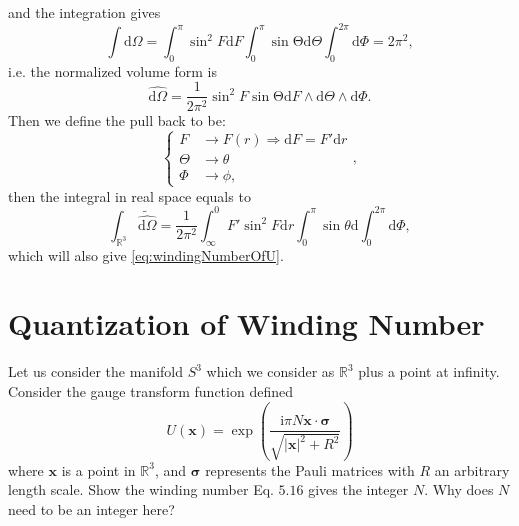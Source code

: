 \documentclass{book}
\begin{document}
and the integration gives
\begin{equation*}
\int \mathrm{d} \Omega =\int _{0}^{\pi }\sin^{2} F\mathrm{d} F\int _{0}^{\pi }\sin\mathrm{\Theta d} \Theta \int _{0}^{2\pi }\mathrm{d} \Phi =2\pi ^{2} ,
\end{equation*}
i.e. the normalized volume form is
\begin{equation*}
\hat{\mathrm{d} \Omega } =\frac{1}{2\pi ^{2}}\sin^{2} F\sin\mathrm{\Theta d} F\land \mathrm{d} \Theta \land \mathrm{d} \Phi .
\end{equation*}
Then we define the pull back to be:
\begin{equation*}
\left\{\begin{aligned}
F & \rightarrow F( r) \Rightarrow \mathrm{d} F=F'\mathrm{d} r\\
\Theta  & \rightarrow \theta \\
\Phi  & \rightarrow \phi ,
\end{aligned}\right. ,
\end{equation*}
then the integral in real space equals to
\begin{equation*}
\int _{\mathbb{R}^{3}}\tilde{\hat{\mathrm{d} \Omega }} =\frac{1}{2\pi ^{2}}\int _{\infty }^{0} F'\sin^{2} F\mathrm{d} r\int _{0}^{\pi }\sin \theta \mathrm{d}\int _{0}^{2\pi }\mathrm{d} \Phi ,
\end{equation*}
which will also give \eqref{eq:windingNumberOfU}.

\section{Quantization of Winding Number}
Let us consider the manifold $S^{3}$ which we consider as $\mathbb{R}^{3}$ plus a point at infinity. Consider the gauge transform function defined
\begin{equation*}
U(\boldsymbol{x} )=\exp\left(\frac{\mathrm{i} \pi N\boldsymbol{x} \cdot \boldsymbol{\sigma }}{\sqrt{|\boldsymbol{x} |^{2} +R^{2}}}\right)
\end{equation*}
where $\boldsymbol{x}$ is a point in $\mathbb{R}^{3}$, and $\boldsymbol{\sigma }$ represents the Pauli matrices with $R$ an arbitrary length scale. Show the winding number Eq. $5.16$ gives the integer $N$. Why does $N$ need to be an integer here?
\end{document}
